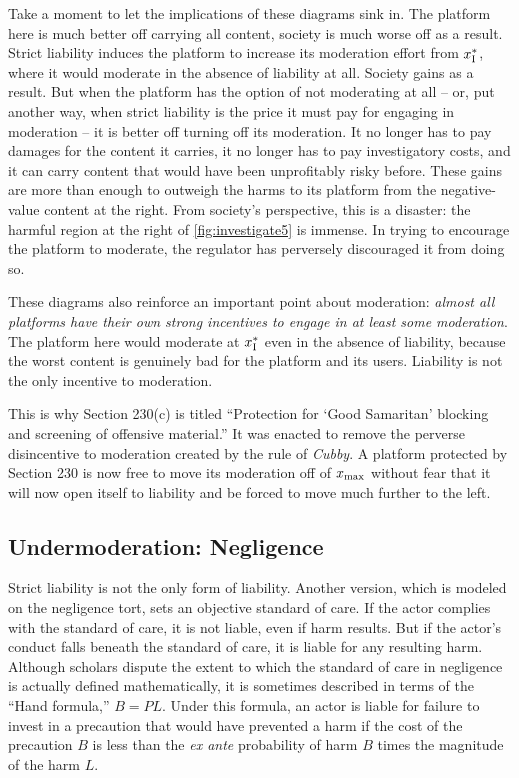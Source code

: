 Take a moment to let the implications of these diagrams sink in. The platform here is much better off carrying all content, society is much worse off as a result. Strict liability induces the platform to increase its moderation effort from $x_{\text{I}}^*$, where it would moderate in the absence of liability at all. Society gains as a result. But when the platform has the option of not moderating at all -- or, put another way, when strict liability is the price it must pay for engaging in moderation -- it is better off turning off its moderation. It no longer has to pay damages for the content it carries, it no longer has to pay investigatory costs, and it can carry content that would have been unprofitably risky before. These gains are more than enough to outweigh the harms to its platform from the negative-value content at the right. From society's perspective, this is a disaster: the harmful region at the right of \autoref{fig:investigate5} is immense. In trying to encourage the platform to moderate, the regulator has perversely discouraged it from doing so.

These diagrams also reinforce an important point about moderation: \emph{almost all platforms have their own strong incentives to engage in at least some moderation}. The platform here would moderate at $x_{\text{I}}^*$ even in the absence of liability, because the worst content is genuinely bad for the platform and its users. Liability is not the only incentive to moderation.

This is why Section 230(c) is titled ``Protection for `Good Samaritan' blocking and screening of offensive material.'' It was enacted to remove the perverse disincentive to moderation created by the rule of \emph{Cubby}. A platform protected by Section 230 is now free to move its moderation off of $x_{\text{max}}$ without fear that it will now open itself to liability and be forced to move much further to the left.



\subsection{Undermoderation: Negligence}

Strict liability is not the only form of liability. Another version, which is modeled on the negligence tort, sets an objective standard of care. If the actor complies with the standard of care, it is not liable, even if harm results. But if the actor's conduct falls beneath the standard of care, it is liable for any resulting harm. Although scholars dispute the extent to which the standard of care in negligence is actually defined mathematically, it is sometimes described in terms of the ``Hand formula,'' $B = PL$. Under this formula, an actor is liable for failure to invest in a precaution that would have prevented a harm if the cost of the precaution $B$ is less than the \emph{ex ante} probability of harm $B$ times the magnitude of the harm $L$.

